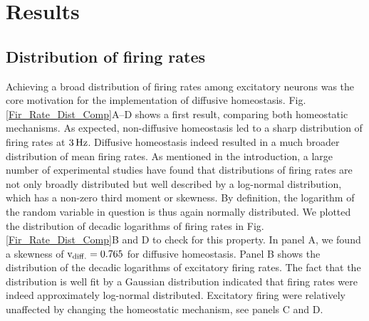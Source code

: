 \documentclass[10pt,letterpaper]{article}
\begin{document}
\section*{Results}
\subsection*{Distribution of firing rates}\label{Fir_Dist_Section}
Achieving a broad distribution of firing rates among excitatory neurons was the core motivation for the implementation of diffusive homeostasis. Fig. \ref{Fir_Rate_Dist_Comp}A--D shows a first result, comparing both homeostatic mechanisms. As expected, non-diffusive homeostasis led to a sharp distribution of firing rates at $\rm 3\, Hz$. Diffusive homeostasis indeed resulted in a much broader distribution of mean firing rates. As mentioned in the introduction, a large number of experimental studies have found that distributions of firing rates are not only broadly distributed but well described by a log-normal distribution, which has a non-zero third moment or skewness. By definition, the logarithm of the random variable in question is thus again normally distributed. We plotted the distribution of decadic logarithms of firing rates in Fig. \ref{Fir_Rate_Dist_Comp}B and D to check for this property. In panel A, we found a skewness of $\mathrm{v_{\rm diff.} = 0.765}$ for diffusive homeostasis. Panel B shows the distribution of the decadic logarithms of excitatory firing rates. The fact that the distribution is well fit by a Gaussian distribution indicated that firing rates were indeed approximately log-normal distributed. Excitatory firing were relatively unaffected by changing the homeostatic mechanism, see panels C and D.  
\end{document}
